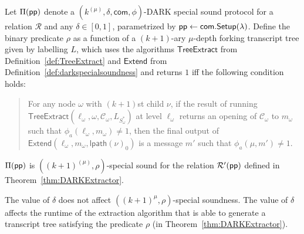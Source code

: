 \begin{lemma} \label{lem:DARKExtractor}
Let $\Pi(\textsf{pp})$ denote a $(k^{(\mu)}, \delta, \textsf{com}, \phi)$-DARK special sound protocol for a relation $\mathcal{R}$ and any $\delta \in [0,1]$, parametrized by $\textsf{pp} \gets \textsf{com}.\textsf{{Setup}}(\lambda)$. Define the binary predicate $\rho$ as a function of a $(k+1)$-ary $\mu$-depth forking transcript tree given by labelling $L$, which uses the algorithms $\textsf{TreeExtract}$ from Definition~\ref{def:TreeExtract} and $\textsf{Extend}$ from Definition~\ref{def:darkspecialsoundness} and returns $1$ iff the following condition holds: 

\begin{quote} For any node $\omega$ with $(k+1)$st child $\nu$, if the result of running $\textsf{TreeExtract}(\ell_\omega, \omega, \mathcal{C}_\omega, L_{S^*_\omega})$ at level $\ell_\omega$ returns an opening of $\mathcal{C}_\omega$ to $m_\omega$ such that $\phi_a(\ell_\omega, m_\omega) \neq 1$, then the final output of $\textsf{Extend}(\ell_\omega, m_\omega, \textsf{lpath}(\nu)_0)$ is a message $m'$ such that $\phi_a(\mu, m') \neq 1$. 	
\end{quote}


$\Pi(\textsf{pp})$ is $((k+1)^{(\mu)}, \rho)$-special sound for the relation $\mathcal{R}'(\textsf{pp})$ defined in Theorem~\ref{thm:DARKExtractor}. 
 	
\end{lemma}
\begin{remark}
 The value of $\delta$ does not affect $((k+1)^\mu, \rho)$-special soundness. The value of $\delta$ affects the runtime of the extraction algorithm that is able to generate a transcript tree satisfying the predicate $\rho$ (in Theorem~\ref{thm:DARKExtractor}). 
\end{remark}
